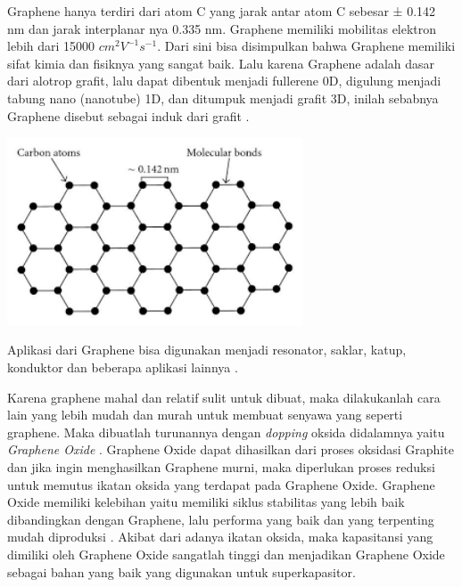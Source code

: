 \documentclass[12pt,a4paper]{report}
\begin{document}
	Graphene hanya terdiri dari atom C yang jarak antar atom C sebesar ± 0.142 nm \cite{Zhen2017} dan jarak interplanar nya 0.335 nm. Graphene memiliki mobilitas elektron lebih dari
 	15000 $ cm^2 V^{-1} s^{-1} $. Dari sini bisa disimpulkan bahwa Graphene memiliki sifat kimia dan fisiknya yang sangat baik. Lalu karena Graphene adalah dasar dari alotrop grafit, lalu dapat dibentuk menjadi fullerene 0D, digulung menjadi tabung nano (nanotube) 1D, dan ditumpuk menjadi grafit 3D, inilah sebabnya Graphene disebut sebagai induk dari grafit \cite{Chakraborty2018}.
		
	\begin{center}
	\includegraphics[width=8.75cm]{gambar/grafen.png}
	\end{center}
	
	Aplikasi dari Graphene bisa digunakan menjadi resonator, saklar, katup, konduktor dan beberapa aplikasi lainnya \cite{Clemons2010}.
	
	Karena graphene mahal dan relatif sulit untuk dibuat, maka dilakukanlah cara lain yang lebih mudah dan murah untuk membuat senyawa yang seperti graphene. Maka dibuatlah turunannya dengan \textit{dopping} oksida didalamnya yaitu \textit{Graphene Oxide} \cite{MetalgrassLTD2019}. Graphene Oxide dapat dihasilkan dari proses oksidasi Graphite dan jika ingin menghasilkan Graphene murni, maka diperlukan proses reduksi untuk memutus ikatan oksida yang terdapat pada Graphene Oxide. Graphene Oxide memiliki kelebihan yaitu memiliki siklus stabilitas yang lebih baik dibandingkan dengan Graphene, lalu performa yang baik dan yang terpenting mudah diproduksi \cite{Korkmaz2020}. Akibat dari adanya ikatan oksida, maka kapasitansi yang dimiliki oleh Graphene Oxide sangatlah tinggi dan menjadikan Graphene Oxide sebagai bahan yang baik yang digunakan untuk superkapasitor.
	
\end{document}
